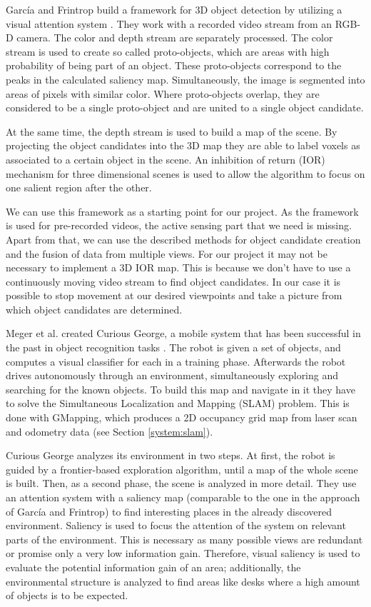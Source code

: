 \documentclass[a4paper,11pt,english]{article}
\begin{document}
García and Frintrop build a framework for 3D object detection by utilizing a visual attention system \cite{garcia2013computational}.
They work with a recorded video stream from an RGB-D camera.
The color and depth stream are separately processed. 
The color stream is used to create so called proto-objects, which are areas with high probability of being part of an object.
These proto-objects correspond to the peaks in the calculated saliency map. 
Simultaneously, the image is segmented into areas of pixels with similar color. 
Where proto-objects overlap, they are considered to be a single proto-object and are united to a single object candidate.

At the same time, the depth stream is used to build a map of the scene.
By projecting the object candidates into the 3D map they are able to label voxels as associated to a certain object in the scene.
An inhibition of return (IOR) mechanism for three dimensional scenes is used to allow the algorithm to focus on one salient region after the other.

We can use this framework as a starting point for our project.
As the framework is used for pre-recorded videos, the active sensing part that we need is missing.
Apart from that, we can use the described methods for object candidate creation and the fusion of data from multiple views.
For our project it may not be necessary to implement a 3D IOR map.
This is because we don't have to use a continuously moving video stream to find object candidates.
In our case it is possible to stop movement at our desired viewpoints and take a picture from which object candidates are determined. \medskip

Meger et al. created Curious George, a mobile system that has been successful in the past in object recognition tasks \cite{meger2010curious}.
The robot is given a set of objects, and computes a visual classifier for each in a training phase.
Afterwards the robot drives autonomously through an environment, simultaneously exploring and searching for the known objects.
To build this map and navigate in it they have to solve the Simultaneous Localization and Mapping (SLAM) problem.
This is done with GMapping, which produces a 2D occupancy grid map from laser scan and odometry data (see Section \ref{system:slam}).

Curious George analyzes its environment in two steps.
At first, the robot is guided by a frontier-based exploration algorithm, until a map of the whole scene is built.
Then, as a second phase, the scene is analyzed in more detail.
They use an attention system with a saliency map (comparable to the one in the approach of García and Frintrop) to find interesting places in the already discovered environment.
Saliency is used to focus the attention of the system on relevant parts of the environment.
This is necessary as many possible views are redundant or promise only a very low information gain.
Therefore, visual saliency is used to evaluate the potential information gain of an area; additionally, the environmental structure is analyzed to find areas like desks where a high amount of objects is to be expected.
\end{document}
